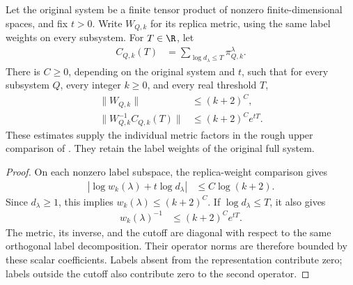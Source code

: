 \begin{theorem}
    \label{thm:replica_metric_cutoff_norm}
    \leanok
    Let the original system be a finite tensor product of nonzero
    finite-dimensional spaces, and fix $t>0$. Write $W_{Q,k}$ for its
    replica metric, using the same label weights on every subsystem.
    For $T\in\R$, let
    \begin{align*}
        C_{Q,k}(T)
         & =\sum_{\log d_\lambda\le T}\pi_{Q,k}^\lambda.
    \end{align*}
    There is $C\ge0$, depending on the original system and $t$, such
    that for every subsystem $Q$, every integer $k\ge0$, and every
    real threshold $T$,
    \begin{align*}
        \|W_{Q,k}\| & \le(k+2)^C,        \\
        \|W_{Q,k}^{-1}C_{Q,k}(T)\|
                    & \le(k+2)^C e^{tT}.
    \end{align*}
    These estimates supply the individual metric factors in the rough
    upper comparison of \cite[Section~8, upper comparisons]{OpenAI2026AreaLaw}. They retain the label weights of
    the original full system.
\end{theorem}
\begin{proof}
    \leanok
    On each nonzero label subspace, the replica-weight comparison gives
    \begin{align*}
        |\log w_k(\lambda)+t\log d_\lambda|
         & \le C\log(k+2).
    \end{align*}
    Since $d_\lambda\ge1$, this implies $w_k(\lambda)\le(k+2)^C$.
    If $\log d_\lambda\le T$, it also gives
    \begin{align*}
        w_k(\lambda)^{-1}
         & \le(k+2)^C e^{tT}.
    \end{align*}
    The metric, its inverse, and the cutoff are diagonal with respect
    to the same orthogonal label decomposition. Their operator norms
    are therefore bounded by these scalar coefficients. Labels absent
    from the representation contribute zero; labels outside the cutoff
    also contribute zero to the second operator.
\end{proof}

